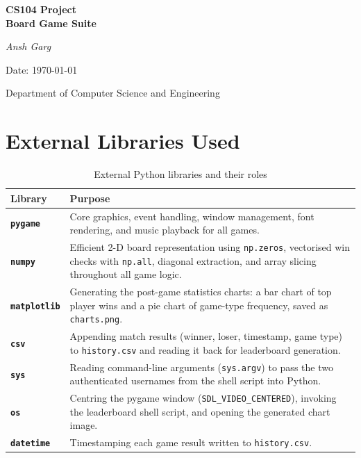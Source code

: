 \documentclass[12pt]{article}
\begin{document}
\begin{titlepage}
    \centering
    \vspace*{2cm}
    {\Huge\bfseries CS104 Project\\[0.4em]Board Game Suite\par}
    \vspace{1.5cm}
    {\Large\itshape Ansh Garg\par}
    \vspace{0.5cm}
    {\large Date: \today\par}
    \vfill
    {\large Department of Computer Science and Engineering\par}
\end{titlepage}

\tableofcontents
\newpage

\section{External Libraries Used}

\begin{table}[h!]
\centering
\renewcommand{\arraystretch}{1.4}
\begin{tabular}{>{\bfseries}p{3cm} p{10cm}}
\toprule
Library & Purpose \\
\midrule
\texttt{pygame}    & Core graphics, event handling, window management, font rendering, and music playback for all games. \\
\texttt{numpy}     & Efficient 2-D board representation using \texttt{np.zeros}, vectorised win checks with \texttt{np.all}, diagonal extraction, and array slicing throughout all game logic. \\
\texttt{matplotlib}& Generating the post-game statistics charts: a bar chart of top player wins and a pie chart of game-type frequency, saved as \texttt{charts.png}. \\
\texttt{csv}       & Appending match results (winner, loser, timestamp, game type) to \texttt{history.csv} and reading it back for leaderboard generation. \\
\texttt{sys}       & Reading command-line arguments (\texttt{sys.argv}) to pass the two authenticated usernames from the shell script into Python. \\
\texttt{os}        & Centring the pygame window (\texttt{SDL\_VIDEO\_CENTERED}), invoking the leaderboard shell script, and opening the generated chart image. \\
\texttt{datetime}  & Timestamping each game result written to \texttt{history.csv}. \\
\bottomrule
\end{tabular}
\caption{External Python libraries and their roles}
\end{table}
\end{document}

